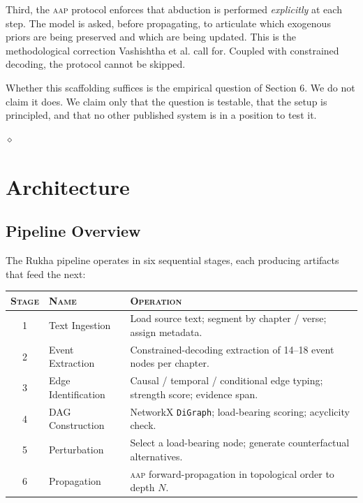 \documentclass[11pt]{article}
\theoremstyle{rukha}
\newcommand{\diamondrule}{%
  \begin{center}\vspace{0.6em}%
  {\scriptsize $\diamond$}\vspace{0.6em}\end{center}}
\newcommand{\sceq}[1]{\textsc{#1}}
\begin{document}
Third, the \textsc{aap} protocol enforces that abduction is performed
\emph{explicitly} at each step. The model is asked, before propagating,
to articulate which exogenous priors are being preserved and which are
being updated. This is the methodological correction Vashishtha et al.
\cite{executablecounterfactuals} call for. Coupled with constrained
decoding, the protocol cannot be skipped.

Whether this scaffolding suffices is the empirical question of Section
6. We do not claim it does. We claim only that the question is testable,
that the setup is principled, and that no other published system is in a
position to test it.

\diamondrule

\section{Architecture}

\subsection{Pipeline Overview}

The Rukha pipeline operates in six sequential stages, each producing
artifacts that feed the next:

\begin{center}\small
\begin{tabular}{@{}c l p{3.4in}@{}}
  \toprule
  \sceq{Stage} & \sceq{Name} & \sceq{Operation} \\
  \midrule
  1 & Text Ingestion       & Load source text; segment by chapter / verse; assign metadata. \\
  2 & Event Extraction     & Constrained-decoding extraction of 14--18 event nodes per chapter. \\
  3 & Edge Identification  & Causal / temporal / conditional edge typing; strength score; evidence span. \\
  4 & DAG Construction     & NetworkX \texttt{DiGraph}; load-bearing scoring; acyclicity check. \\
  5 & Perturbation         & Select a load-bearing node; generate counterfactual alternatives. \\
  6 & Propagation          & \textsc{aap} forward-propagation in topological order to depth $N$. \\
  \bottomrule
\end{tabular}
\end{center}
\end{document}
